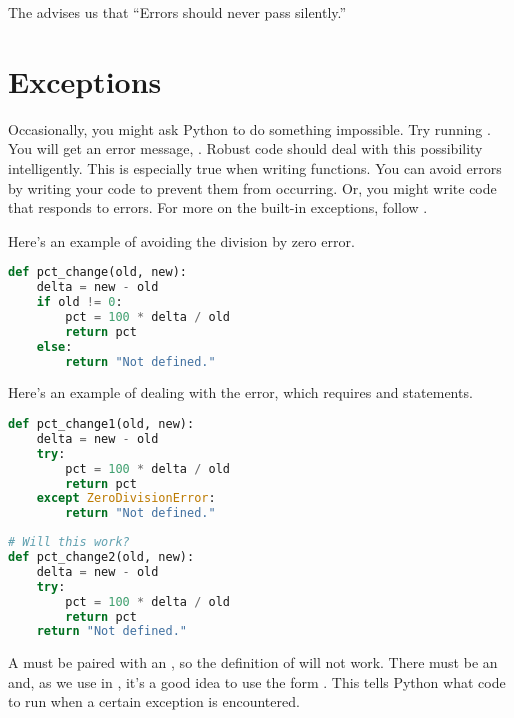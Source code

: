 

The  advises us that ``Errors should never pass silently.'' 


\section{Exceptions}
\medskip

Occasionally, you might ask Python to do something impossible. Try running . You will get an error message, . Robust code should deal with this possibility intelligently. This is especially true when writing functions. You can avoid errors by writing your code to prevent them from occurring. Or, you might write code that responds to errors. For more on the built-in exceptions, follow .

\smallskip
\noindent Here's an example of avoiding the division by zero error. 

\begin{lstlisting}[language = Python]
def pct_change(old, new):
    delta = new - old
    if old != 0:
        pct = 100 * delta / old
        return pct
    else:
        return "Not defined."\end{lstlisting}
        
\smallskip
\noindent Here's an example of dealing with the error, which requires  and  statements.

\begin{lstlisting}[language = Python]
def pct_change1(old, new):
    delta = new - old
    try:
        pct = 100 * delta / old
        return pct
    except ZeroDivisionError:
        return "Not defined."\end{lstlisting}
        
\smallskip
\begin{lstlisting}[language = Python]
# Will this work?
def pct_change2(old, new):
    delta = new - old
    try:
        pct = 100 * delta / old
        return pct
    return "Not defined."\end{lstlisting}
    
    
\smallskip
\noindent A  must be paired with an , so the definition of  will not work. There must be an  and, as we use in , it's a good idea to use the form . This tells Python what code to run when a certain exception is encountered.


